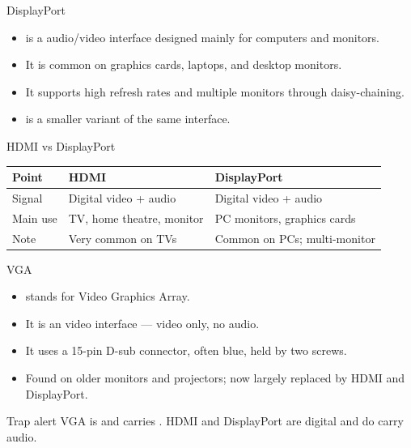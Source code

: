 \documentclass[aspectratio=169]{beamer}
\begin{document}
\begin{frame}{DisplayPort}
  \begin{itemize}
    \item {} is a  audio/video interface designed
      mainly for computers and monitors.
    \item It is common on graphics cards, laptops, and desktop monitors.
    \item It supports high refresh rates and multiple monitors through
      daisy-chaining.
    \item {} is a smaller variant of the same interface.
  \end{itemize}
\end{frame}

\begin{frame}{HDMI vs DisplayPort}
  \begin{center}
    \begin{tabular}{p{}p{}p{}}
      \toprule
      \textbf{Point} & \textbf{HDMI} & \textbf{DisplayPort} \\
      \midrule
      Signal & Digital video + audio & Digital video + audio \\
      Main use & TV, home theatre, monitor & PC monitors, graphics cards \\
      Note & Very common on TVs & Common on PCs; multi-monitor \\
      \bottomrule
    \end{tabular}
  \end{center}
  \vspace{0.25cm}
\end{frame}

\begin{frame}{VGA}
  \begin{itemize}
    \item {} stands for Video Graphics Array.
    \item It is an  video interface --- video only, no audio.
    \item It uses a 15-pin D-sub connector, often blue, held by two screws.
    \item Found on older monitors and projectors; now largely replaced by
      HDMI and DisplayPort.
  \end{itemize}
  \begin{alertblock}{Trap alert}
    VGA is  and carries . HDMI and DisplayPort are
    digital and do carry audio.
  \end{alertblock}
\end{frame}
\end{document}

